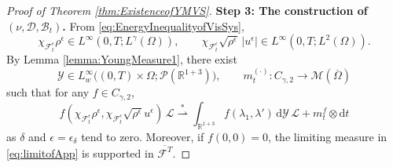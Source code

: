 \documentclass[11pt,twoside,reqno]{amsart}
\numberwithin{equation}{section}
\numberwithin{figure}{section}
\begin{document}
\begin{proof}[Proof of Theorem \ref{thm:ExistenceofYMVS}]
\smallskip
\textbf{Step 3: The construction of $(\nu,\mathcal{D},\mathcal{B}_t)$.} %
From \eqref{eq:EnergyInequalityofVisSys},
\[
\chi_{\mathcal{F}^{\epsilon}_t}\rho^\epsilon\in L^\infty(0,T;L^\gamma(\Omega)),\qquad 
\chi_{\mathcal{F}^{\epsilon}_t}\sqrt{\rho^\epsilon}\,|u^\epsilon|\in L^\infty(0,T;L^2(\Omega)).
\]
By Lemma \ref{lemma:YoungMeasure1}, there exist 
\[
\mathcal{Y}\in L^{\infty}_w\big((0,T)\times\Omega;\mathcal{P}(\mathbb{R}^{1+3})\big),\qquad 
m_t^{(\cdot)}: C_{\gamma,2}\to \mathcal{M}(\overline{\Omega})
\]
such that for any $f\in C_{\gamma,2}$,
\begin{equation}\label{eq:limitofApp}
f(\chi_{\mathcal{F}^{\epsilon}_t}\rho^\epsilon,\chi_{\mathcal{F}^{\epsilon}_t}\sqrt{\rho^\epsilon}u^\epsilon)\,\mathcal{L}
\overset{*}{\rightharpoonup}\int_{\mathbb{R}^{1+3}} f(\lambda_1,\lambda')\,\mathrm{d}\mathcal{Y}\,\mathcal{L}
+ m^f_t\otimes \mathrm{d}t 
\end{equation}
as $\delta$ and $\epsilon=\epsilon_\delta$ tend to zero.
Moreover, if $f(0,0)=0$, the limiting measure in \eqref{eq:limitofApp} is supported in $\overline{\mathcal{F}^T}$.


\end{proof}
\end{document}

